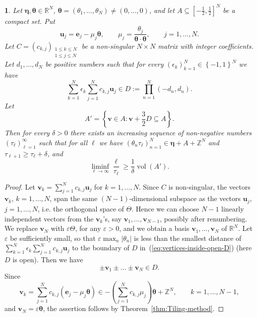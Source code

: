 \documentclass[oneside,english]{amsart}
\numberwithin{equation}{section}
\numberwithin{figure}{section}
\theoremstyle{plain}
\theoremstyle{plain}
\newtheorem{prop}{\protect\propositionname}
\theoremstyle{plain}
\theoremstyle{definition}
\providecommand{\propositionname}{Proposition}
\begin{document}
\begin{prop}
\label{prop:Tiling}Let $\boldsymbol{\eta},\boldsymbol{\theta}\in\mathbb{R}^{N}$,
$\boldsymbol{\theta}=(\theta_{1},\dotsc,\theta_{N})\neq(0,\dotsc,0)$,
and let $A\subseteq\left[-\tfrac{1}{2},\tfrac{1}{2}\right]^{N}$ be
a compact set. Put
\[
\boldsymbol{u}_{j}=\boldsymbol{e}_{j}-\mu_{j}\boldsymbol{\theta},\qquad\mu_{j}=\frac{\theta_{j}}{\boldsymbol{\theta}\cdot\boldsymbol{\theta}},\qquad j=1,\dotsc,N.
\]
Let $C=\left(c_{k,j}\right)_{\substack{1\leq k\leq N\\
1\leq j\leq N
}
}$ be a non-singular $N\times N$ matrix with integer coefficients.
Let $d_{1},\dotsc,d_{N}$ be positive numbers such that for every
$(\epsilon_{k})_{k=1}^{N}\in\left\{ -1,1\right\} ^{N}$ we have
\begin{equation}
\sum_{k=1}^{N}\epsilon_{k}\sum_{j=1}^{N}c_{k,j}\boldsymbol{u}_{j}\in D:=\prod_{n=1}^{N}(-d_{n},d_{n}).\label{eq:vertices-inside-open-D}
\end{equation}
Let
\[
A'=\left\{ \boldsymbol{v}\in A:\boldsymbol{v}+\frac{3}{2}D\subseteq A\right\} .
\]
Then for every $\delta>0$ there exists an increasing sequence of
non-negative numbers $(\tau_{\ell})_{\ell=1}^{\infty}$ such that
for all $\ell$ we have $\left(\theta_{n}\tau_{\ell}\right)_{n=1}^{N}\in\boldsymbol{\eta}+A+\mathbb{Z}^{N}$
and $\tau_{\ell+1}\geq\tau_{\ell}+\delta$, and 
\[
\liminf_{\ell\to\infty}\frac{\ell}{\tau_{\ell}}\geq\frac{1}{\delta}\operatorname{vol}(A').
\]
\end{prop}
\begin{proof}
Let $\boldsymbol{v}_{k}=\sum_{j=1}^{N}c_{k,j}\boldsymbol{u}_{j}$
for $k=1,\dotsc,N$. Since $C$ is non-singular, the vectors $\boldsymbol{v}_{k}$,
$k=1,\dotsc,N$, span the same $(N-1)$-dimensional subspace as the
vectors $\boldsymbol{u}_{j}$, $j=1,\dotsc,N$, i.e. the orthogonal
space of $\boldsymbol{\varTheta}$. Hence we can choose $N-1$ linearly
independent vectors from the $\boldsymbol{v}_{k}$'s, say $\boldsymbol{v}_{1},\dotsc,\boldsymbol{v}_{N-1}$,
possibly after renumbering. We replace $\boldsymbol{v}_{N}$ with
$\varepsilon\boldsymbol{\varTheta}$, for any $\varepsilon>0$, and
we obtain a basis $\boldsymbol{v}_{1},\dotsc,\boldsymbol{v}_{N}$
of $\mathbb{R}^{N}$. Let $\varepsilon$ be sufficiently small, so
that $\varepsilon\max_{n}\left|\theta_{n}\right|$ is less than the
smallest distance of $\sum_{k=1}^{N}\epsilon_{k}\sum_{j=1}^{N}c_{k,j}\boldsymbol{u}_{j}$
to the boundary of $D$ in~(\ref{eq:vertices-inside-open-D}) (here
$D$ is open). Then we have
\[
\pm\boldsymbol{v}_{1}\pm\dotsc\pm\boldsymbol{v}_{N}\in D.
\]
Since
\[
\boldsymbol{v}_{k}=\sum_{j=1}^{N}c_{k,j}\left(\boldsymbol{e}_{j}-\mu_{j}\boldsymbol{\theta}\right)\in-\left(\sum_{j=1}^{N}c_{k,j}\mu_{j}\right)\boldsymbol{\theta}+\mathbb{Z}^{N},\qquad k=1,\dotsc,N-1,
\]
and $\boldsymbol{v}_{N}=\varepsilon\boldsymbol{\theta}$, the assertion
follows by Theorem~\ref{thm:Tiling-method}.
\end{proof}
\end{document}
